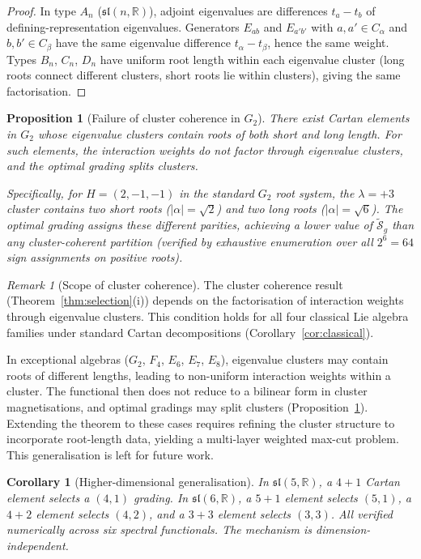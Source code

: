 \documentclass[11pt]{article}
\theoremstyle{plain}
\newtheorem{corollary}[theorem]{Corollary}
\newtheorem{proposition}[theorem]{Proposition}
\theoremstyle{definition}
\theoremstyle{remark}
\newtheorem*{remark}{Remark}
\newcommand{\sln}[1]{\mathfrak{sl}(#1,\mathbb{R})}
\begin{document}
\begin{proof}
In type $A_n$ ($\sln{n}$), adjoint eigenvalues are differences
$t_a - t_b$ of defining-representation eigenvalues.  Generators
$E_{ab}$ and $E_{a'b'}$ with $a, a' \in C_\alpha$ and
$b, b' \in C_\beta$ have the same eigenvalue difference
$t_\alpha - t_\beta$, hence the same weight.  Types $B_n$, $C_n$,
$D_n$ have uniform root length within each eigenvalue cluster
(long roots connect different clusters, short roots lie within
clusters), giving the same factorisation.
\end{proof}

\begin{proposition}[Failure of cluster coherence in $G_2$]
\label{prop:G2}
There exist Cartan elements in $G_2$ whose eigenvalue clusters
contain roots of both short and long length.  For such elements,
the interaction weights do not factor through eigenvalue clusters,
and the optimal grading splits clusters.

Specifically, for $H = (2, -1, -1)$ in the standard $G_2$ root
system, the $\lambda = +3$ cluster contains two short roots
($|\alpha| = \sqrt{2}$) and two long roots ($|\alpha| = \sqrt{6}$).
The optimal grading assigns these different parities, achieving a
lower value of $\widetilde{\mathcal{S}}_g$ than any cluster-coherent
partition (verified by exhaustive enumeration over all $2^6 = 64$
sign assignments on positive roots).
\end{proposition}

\begin{remark}[Scope of cluster coherence]
\label{rem:scope}
The cluster coherence result (Theorem~\ref{thm:selection}(i))
depends on the factorisation of interaction weights through
eigenvalue clusters.  This condition holds for all four classical
Lie algebra families under standard Cartan decompositions
(Corollary~\ref{cor:classical}).

In exceptional algebras ($G_2$, $F_4$, $E_6$, $E_7$, $E_8$),
eigenvalue clusters may contain roots of different lengths,
leading to non-uniform interaction weights within a cluster.
The functional then does not reduce to a bilinear form in
cluster magnetisations, and optimal gradings may split clusters
(Proposition~\ref{prop:G2}).  Extending the theorem to these
cases requires refining the cluster structure to incorporate
root-length data, yielding a multi-layer weighted max-cut
problem.  This generalisation is left for future work.
\end{remark}

\begin{corollary}[Higher-dimensional generalisation]
\label{cor:higher}
In $\sln{5}$, a $4{+}1$ Cartan element selects a $(4,1)$ grading.
In $\sln{6}$, a $5{+}1$ element selects $(5,1)$, a $4{+}2$ element
selects $(4,2)$, and a $3{+}3$ element selects $(3,3)$.  All verified
numerically across six spectral functionals.  The mechanism is
dimension-independent.
\end{corollary}
\end{document}
